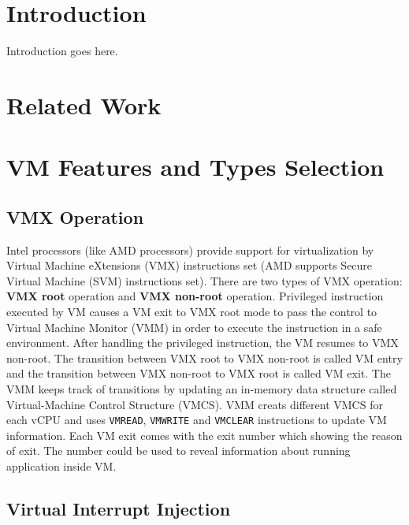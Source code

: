 \documentclass[10pt, conference, compsocconf]{IEEEtran}
\begin{document}
\section{Introduction}

Introduction goes here. 

\section{Related Work}





\section{VM Features and Types Selection}

\subsection{VMX Operation}

Intel processors (like AMD processors) provide support for virtualization by Virtual Machine eXtensions (VMX) instructions set (AMD
supports Secure Virtual Machine (SVM) instructions set). There are two types of VMX operation: \textbf{VMX root} operation and \textbf{VMX non-root} operation.  Privileged instruction executed by VM causes a VM exit to VMX root mode to pass the control to Virtual Machine Monitor (VMM) in order to execute the instruction in a safe environment.  After handling the privileged instruction, the VM resumes to VMX non-root. The transition between VMX root to VMX non-root is called VM entry and the transition between VMX non-root to VMX root is called VM exit.  The VMM keeps track of transitions by updating an in-memory data structure called Virtual-Machine Control Structure (VMCS). VMM creats different VMCS for each vCPU and uses \texttt{VMREAD}, \texttt{VMWRITE} and \texttt{VMCLEAR} instructions to update VM information. Each VM exit comes with the exit number which showing the reason of exit. The number could be used to reveal information about running application inside VM. 

\subsection{Virtual Interrupt Injection}
\end{document}
